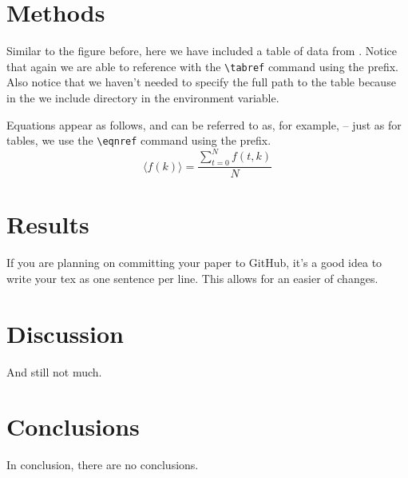 \documentclass[\docopts]{\docclass}
\begin{document}
\section{Methods}
\label{sec:methods}

Similar to the figure before, here we have included a table of data from .
Notice that again we are able to reference  with the \verb=\tabref= command using the  prefix.
Also notice that we haven't needed to specify the full path to the table because in the  we include  directory in the  environment variable.



Equations appear as follows, and can be referred to as, for example,  -- just as for tables, we use the \verb=\eqnref= command using the  prefix.
\begin{equation}
  \label{eqn:example}
  \langle f(k) \rangle = \frac{ \sum_{t=0}^{N}f(t,k) }{N}
\end{equation}


\section{Results}
\label{sec:results}

If you are planning on committing your paper to GitHub, it's a good idea to write your tex as one sentence per line.
This allows for an easier  of changes.

\section{Discussion}
\label{sec:discussion}

And still not much.

\section{Conclusions}
\label{sec:conclusions}

In conclusion, there are no conclusions.
\end{document}
